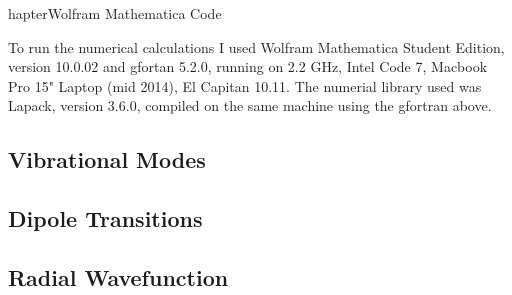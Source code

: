 hapter{Wolfram Mathematica Code}
\label{AppendixD}

To run the numerical calculations I used Wolfram Mathematica Student Edition, version 10.0.02 and gfortan 5.2.0, running on 2.2 GHz, Intel Code 7, Macbook Pro 15" Laptop (mid 2014), El Capitan 10.11. The numerial library used was Lapack, version 3.6.0, compiled on the same machine using the gfortran above.

\subsection{Vibrational Modes}

\subsection{Dipole Transitions}

\subsection{Radial Wavefunction}

